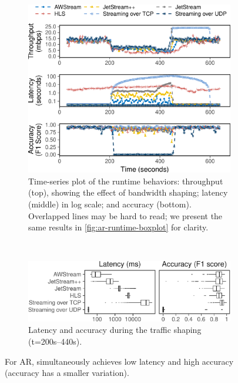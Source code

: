 \begin{figure}[t]
  \begin{subfigure}[t]{\columnwidth}
    \centering
    \includegraphics[width=0.95\columnwidth]{figures/runtime_darknet-timeseries.pdf}
    \caption{Time-series plot of the runtime behaviors: throughput (top),
      showing the effect of bandwidth shaping; latency (middle) in log scale;
      and accuracy (bottom). Overlapped lines may be hard to read; we present
      the same results in \autoref{fig:ar-runtime-boxplot} for clarity.}
    \label{fig:ar-runtime-timeseries}
  \end{subfigure}
  \\
  \vspace{1em}
  \begin{subfigure}[t]{\columnwidth}
    \centering
    \includegraphics[width=\columnwidth]{figures/runtime_darknet-boxplot.pdf}
    \caption{Latency and accuracy during the traffic shaping (t=200s--440s).}
    \label{fig:ar-runtime-boxplot}
  \end{subfigure}
  \caption{For AR, \sysname{} simultaneously achieves low latency and high
    accuracy (accuracy has a smaller variation).}
  \label{fig:ar-runtime}
  \vspace{-0.8em}
\end{figure}

